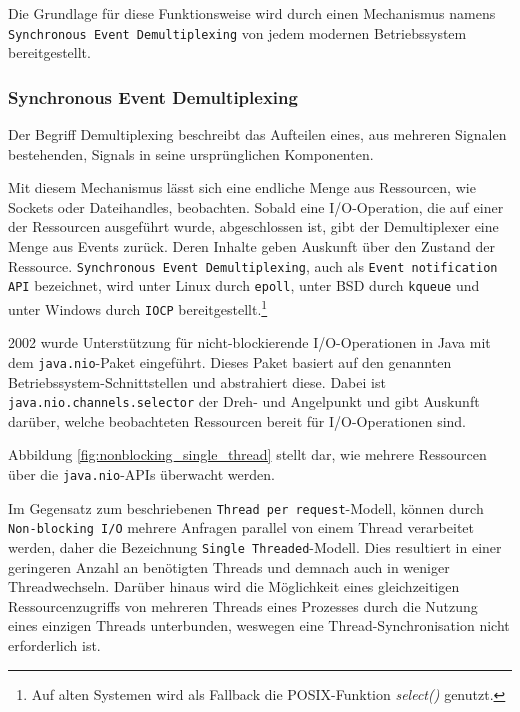 Die Grundlage für diese Funktionsweise wird durch einen Mechanismus namens \verb|Synchronous Event Demultiplexing|
von jedem modernen Betriebssystem bereitgestellt.

\subsubsection{Synchronous Event Demultiplexing}
\label{subsubsec:event demultiplexing}
Der Begriff Demultiplexing beschreibt das Aufteilen eines, aus mehreren Signalen bestehenden, Signals
in seine ursprünglichen Komponenten.

Mit diesem Mechanismus lässt sich eine endliche Menge aus Ressourcen, wie Sockets oder Dateihandles, beobachten.
Sobald eine I/O-Operation, die auf einer der Ressourcen ausgeführt wurde, abgeschlossen ist, gibt der Demultiplexer eine Menge aus Events
zurück. Deren Inhalte geben Auskunft über den Zustand der Ressource.\newline
\verb|Synchronous Event Demultiplexing|, auch als \verb|Event notification API| bezeichnet, wird unter Linux durch \verb|epoll|, unter BSD durch
\verb|kqueue| und unter
Windows durch \verb|IOCP| bereitgestellt.\footnote{Auf alten Systemen wird als Fallback die POSIX-Funktion \textit{select()} genutzt.}

2002 wurde Unterstützung für nicht-blockierende I/O-Operationen in Java mit dem \verb|java.nio|-Paket eingeführt.
Dieses Paket basiert auf den genannten Betriebssystem-Schnittstellen und abstrahiert diese.\parencite{OpenJDKNIO}
Dabei ist \verb|java.nio.channels.selector| der Dreh- und Angelpunkt und gibt Auskunft darüber, welche
beobachteten Ressourcen bereit für I/O-Operationen sind.

Abbildung \ref{fig:nonblocking_single_thread} stellt dar, wie mehrere Ressourcen über die
\verb|java.nio|-APIs überwacht werden.

Im Gegensatz zum beschriebenen \verb|Thread per request|-Modell, können durch \newline\verb|Non-blocking I/O|
mehrere Anfragen parallel von einem Thread verarbeitet werden, daher die Bezeichnung \verb|Single Threaded|-Modell.
Dies resultiert in einer geringeren Anzahl an benötigten Threads und demnach auch in weniger Threadwechseln.
Darüber hinaus wird die Möglichkeit eines gleichzeitigen Ressourcenzugriffs von mehreren Threads eines Prozesses
durch die Nutzung eines einzigen Threads unterbunden, weswegen eine Thread-Synchronisation nicht erforderlich ist.

